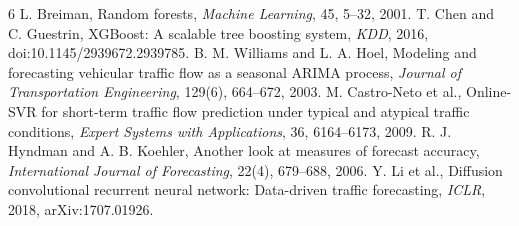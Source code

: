 \documentclass[conference]{IEEEtran}
\begin{document}
\begin{thebibliography}{6}
 L. Breiman, Random forests, \emph{Machine Learning}, 45, 5--32, 2001.
 T. Chen and C. Guestrin, XGBoost: A scalable tree boosting system, \emph{KDD}, 2016, doi:10.1145/2939672.2939785.
 B. M. Williams and L. A. Hoel, Modeling and forecasting vehicular traffic flow as a seasonal ARIMA process, \emph{Journal of Transportation Engineering}, 129(6), 664--672, 2003.
 M. Castro-Neto et al., Online-SVR for short-term traffic flow prediction under typical and atypical traffic conditions, \emph{Expert Systems with Applications}, 36, 6164--6173, 2009.
 R. J. Hyndman and A. B. Koehler, Another look at measures of forecast accuracy, \emph{International Journal of Forecasting}, 22(4), 679--688, 2006.
 Y. Li et al., Diffusion convolutional recurrent neural network: Data-driven traffic forecasting, \emph{ICLR}, 2018, arXiv:1707.01926.
\end{thebibliography}
\end{document}
